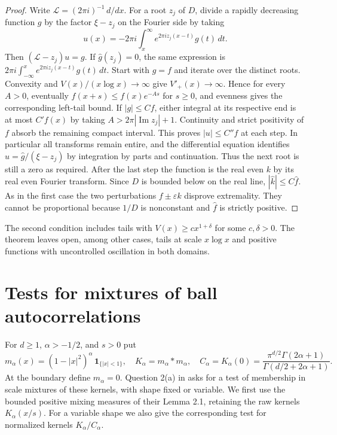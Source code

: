 \documentclass[11pt,a4paper]{article}
\numberwithin{equation}{section}
\begin{document}
\begin{proof}
Write $\mathcal L=(2\pi i)^{-1}\,d/dx$. For a root $z_j$ of $D$, divide a rapidly decreasing function $g$ by the factor $\xi-z_j$ on the Fourier side by taking
\[
 u(x)=-2\pi i\int_x^\infty e^{2\pi i z_j(x-t)}g(t)\,dt.
\]
Then $(\mathcal L-z_j)u=g$. If $\widehat g(z_j)=0$, the same expression is $2\pi i\int_{-\infty}^x e^{2\pi i z_j(x-t)}g(t)\,dt$. Start with $g=f$ and iterate over the distinct roots. Convexity and $V(x)/(x\log x)\to\infty$ give $V'_+(x)\to\infty$. Hence for every $A>0$, eventually $f(x+s)\le f(x)e^{-As}$ for $s\ge0$, and evenness gives the corresponding left-tail bound. If $|g|\le C f$, either integral at its respective end is at most $C' f(x)$ by taking $A>2\pi|\operatorname{Im}z_j|+1$. Continuity and strict positivity of $f$ absorb the remaining compact interval. This proves $|u|\le C'' f$ at each step. In particular all transforms remain entire, and the differential equation identifies $\widehat u=\widehat g/(\xi-z_j)$ by integration by parts and continuation. Thus the next root is still a zero as required. After the last step the function is the real even $k$ by its real even Fourier transform. Since $D$ is bounded below on the real line, $|\widehat k|\le C\widehat f$. As in the first case the two perturbations $f\pm\varepsilon k$ disprove extremality. They cannot be proportional because $1/D$ is nonconstant and $\widehat f$ is strictly positive.
\end{proof}

The second condition includes tails with $V(x)\ge c x^{1+\delta}$ for some $c,\delta>0$. The theorem leaves open, among other cases, tails at scale $x\log x$ and positive functions with uncontrolled oscillation in both domains.

\section{Tests for mixtures of ball autocorrelations}
\label{sec:ballmix}
For $d\ge1$, $\alpha>-1/2$, and $s>0$ put
\[
 m_\alpha(x)=(1-|x|^2)^\alpha\,\mathbf1_{\{|x|<1\}},\quad
 K_\alpha=m_\alpha*m_\alpha,\quad
 C_\alpha=K_\alpha(0)
 =\frac{\pi^{d/2}\Gamma(2\alpha+1)}{\Gamma(d/2+2\alpha+1)}.
\]
At the boundary define $m_\alpha=0$. Question 2(a) in
\cite{JMR2009} asks for a test of membership in scale mixtures of these
kernels, with shape fixed or variable. We first use the bounded positive
mixing measures of their Lemma 2.1, retaining the raw kernels
$K_\alpha(x/s)$. For a variable shape we also give the corresponding test
for normalized kernels $K_\alpha/C_\alpha$.
\end{document}
